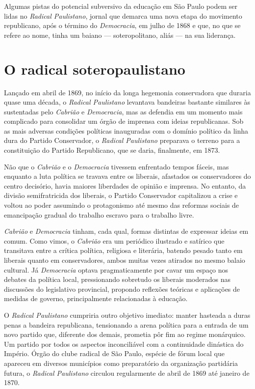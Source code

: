 Algumas pistas do potencial subversivo da educação em São Paulo podem
ser lidas no \emph{Radical Paulistano}, jornal que demarca uma nova
etapa do movimento republicano, após o término do \emph{Democracia}, em
julho de 1868 e que, no que se refere ao nome, tinha um baiano ---
soteropolitano, aliás --- na sua liderança.

\section{O radical soteropaulistano}

Lançado em abril de 1869, no início da longa hegemonia conservadora que
duraria quase uma década, o \emph{Radical Paulistano} levantava
bandeiras bastante similares às sustentadas pelo \emph{Cabrião} e
\emph{Democracia}, mas as defendia em um momento mais complicado para
consolidar um órgão de imprensa com ideias republicanas. Sob as mais
adversas condições políticas inauguradas com o domínio político da linha
dura do Partido Conservador, o \emph{Radical Paulistano} preparava o
terreno para a constituição do Partido Republicano, que se daria,
finalmente, em 1873.

Não que o \emph{Cabrião} e o \emph{Democracia} tivessem enfrentado
tempos fáceis, mas enquanto a luta política se travava entre os
liberais, afastados os conservadores do centro decisório, havia maiores
liberdades de opinião e imprensa. No entanto, da divisão semifratricida
dos liberais, o Partido Conservador capitalizou a crise e voltou ao
poder assumindo o protagonismo até mesmo das reformas sociais de
emancipação gradual do trabalho escravo para o trabalho livre.

\emph{Cabrião} e \emph{Democracia} tinham, cada qual, formas distintas
de expressar ideias em comum. Como vimos, o \emph{Cabrião} era um
periódico ilustrado e satírico que transitava entre a crítica política,
religiosa e literária, batendo pesado tanto em liberais quanto em
conservadores, ambos muitas vezes atirados no mesmo balaio cultural. Já
\emph{Democracia} optava pragmaticamente por cavar um espaço nos debates
da política local, pressionando sobretudo os liberais moderados nas
discussões do legislativo provincial, propondo reflexões teóricas e
aplicações de medidas de governo, principalmente relacionadas à
educação.

O \emph{Radical Paulistano} cumpriria outro objetivo imediato: manter
hasteada a duras penas a bandeira republicana, tensionando a arena
política para a entrada de um novo partido que, diferente dos demais,
prometia pôr fim ao regime monárquico. Um partido por todos os aspectos
inconciliável com a continuidade dinástica do Império. Órgão do
clube radical de São Paulo, espécie de fórum local que apareceu em
diversos municípios como preparatório da organização partidária futura,
o \emph{Radical Paulistano} circulou regularmente de abril de 1869 até
janeiro de 1870.

